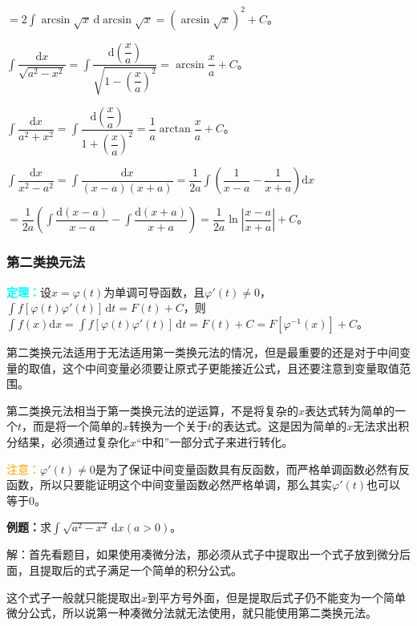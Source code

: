 \documentclass[UTF8, 12pt]{ctexart}
\begin{document}
        $=2\int\arcsin\sqrt{x}\,\textrm{d}\arcsin\sqrt{x}=(\arcsin\sqrt{x})^2+C$。\medskip

        $\displaystyle{\int\dfrac{\textrm{d}x}{\sqrt{a^2-x^2}}}=\displaystyle{\int\dfrac{\textrm{d}\left(\dfrac{x}{a}\right)}{\sqrt{1-\left(\dfrac{x}{a}\right)^2}}}=\arcsin\dfrac{x}{a}+C$。

        $\displaystyle{\int\dfrac{\textrm{d}x}{a^2+x^2}}=\displaystyle{\int\dfrac{\textrm{d}\left(\dfrac{x}{a}\right)}{1+\left(\dfrac{x}{a}\right)^2}}=\dfrac{1}{a}\arctan\dfrac{x}{a}+C$。\medskip

        $\displaystyle{\int\dfrac{\textrm{d}x}{x^2-a^2}}=\displaystyle{\int\dfrac{\textrm{d}x}{(x-a)(x+a)}}=\dfrac{1}{2a}\displaystyle{\int\left(\dfrac{1}{x-a}-\dfrac{1}{x+a}\right)\textrm{d}x}$ \medskip

        $=\dfrac{1}{2a}\left(\displaystyle{\int\dfrac{\textrm{d}(x-a)}{x-a}-\int\dfrac{\textrm{d}(x+a)}{x+a}}\right)=\dfrac{1}{2a}\ln\left\vert\dfrac{x-a}{x+a}\right\vert+C$。

        \subsubsection{第二类换元法}

        \textcolor{aqua}{\textbf{定理：}}设$x=\varphi(t)$为单调可导函数，且$\varphi'(t)\neq 0$，$\int f[\varphi(t)\varphi'(t)]\,\textrm{d}t=F(t)+C$，则$\int f(x)\textrm{d}x=\int f[\varphi(t)\varphi'(t)]\,\textrm{d}t=F(t)+C=F[\varphi^{-1}(x)]+C$。

        第二类换元法适用于无法适用第一类换元法的情况，但是最重要的还是对于中间变量的取值，这个中间变量必须要让原式子更能接近公式，且还要注意到变量取值范围。

        第二类换元法相当于第一类换元法的逆运算，不是将复杂的$x$表达式转为简单的一个$t$，而是将一个简单的$x$转换为一个关于$t$的表达式。这是因为简单的$x$无法求出积分结果，必须通过复杂化$x$“中和”一部分式子来进行转化。

        \textcolor{orange}{注意：}$\varphi'(t)\neq 0$是为了保证中间变量函数具有反函数，而严格单调函数必然有反函数，所以只要能证明这个中间变量函数必然严格单调，那么其实$\varphi'(t)$也可以等于0。

        \textbf{例题：}求$\int\sqrt{a^2-x^2}\,\textrm{d}x(a>0)$。

        解：首先看题目，如果使用凑微分法，那必须从式子中提取出一个式子放到微分后面，且提取后的式子满足一个简单的积分公式。

        这个式子一般就只能提取出$x$到平方号外面，但是提取后式子仍不能变为一个简单微分公式，所以说第一种凑微分法就无法使用，就只能使用第二类换元法。
\end{document}
